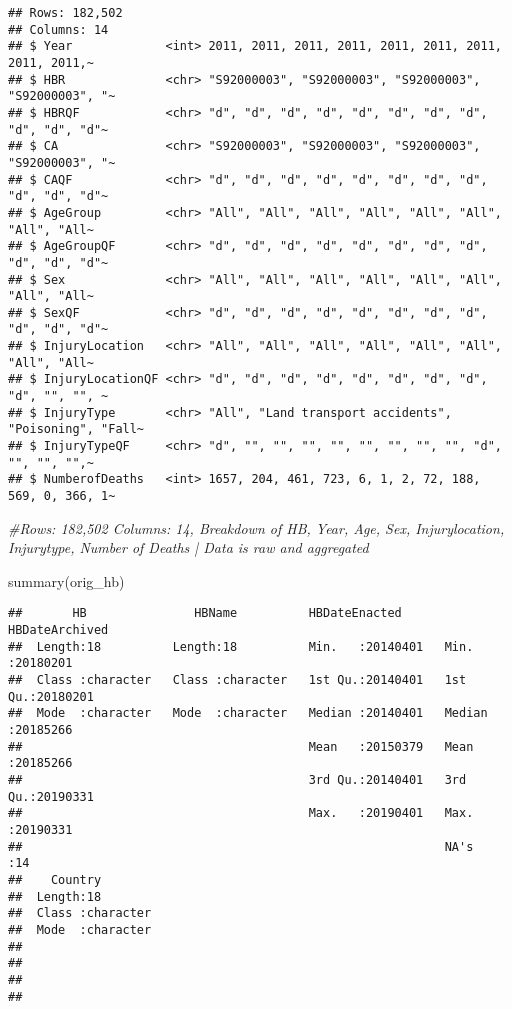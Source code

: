\documentclass[
]{article}
\newenvironment{Shaded}{\begin{snugshade}}{\end{snugshade}}
\newcommand{\CommentTok}[1]{\textcolor[rgb]{0.56,0.35,0.01}{\textit{#1}}}
\newcommand{\FunctionTok}[1]{\textcolor[rgb]{0.00,0.00,0.00}{#1}}
\newcommand{\NormalTok}[1]{#1}
\begin{document}
\begin{verbatim}
## Rows: 182,502
## Columns: 14
## $ Year             <int> 2011, 2011, 2011, 2011, 2011, 2011, 2011, 2011, 2011,~
## $ HBR              <chr> "S92000003", "S92000003", "S92000003", "S92000003", "~
## $ HBRQF            <chr> "d", "d", "d", "d", "d", "d", "d", "d", "d", "d", "d"~
## $ CA               <chr> "S92000003", "S92000003", "S92000003", "S92000003", "~
## $ CAQF             <chr> "d", "d", "d", "d", "d", "d", "d", "d", "d", "d", "d"~
## $ AgeGroup         <chr> "All", "All", "All", "All", "All", "All", "All", "All~
## $ AgeGroupQF       <chr> "d", "d", "d", "d", "d", "d", "d", "d", "d", "d", "d"~
## $ Sex              <chr> "All", "All", "All", "All", "All", "All", "All", "All~
## $ SexQF            <chr> "d", "d", "d", "d", "d", "d", "d", "d", "d", "d", "d"~
## $ InjuryLocation   <chr> "All", "All", "All", "All", "All", "All", "All", "All~
## $ InjuryLocationQF <chr> "d", "d", "d", "d", "d", "d", "d", "d", "d", "", "", ~
## $ InjuryType       <chr> "All", "Land transport accidents", "Poisoning", "Fall~
## $ InjuryTypeQF     <chr> "d", "", "", "", "", "", "", "", "", "d", "", "", "",~
## $ NumberofDeaths   <int> 1657, 204, 461, 723, 6, 1, 2, 72, 188, 569, 0, 366, 1~
\end{verbatim}

\begin{Shaded}
\begin{Highlighting}[]
\CommentTok{\#Rows: 182,502 Columns: 14, Breakdown of HB, Year, Age, Sex, Injurylocation, Injurytype, Number of Deaths | Data is raw and aggregated}

\FunctionTok{summary}\NormalTok{(orig\_hb)}
\end{Highlighting}
\end{Shaded}

\begin{verbatim}
##       HB               HBName          HBDateEnacted      HBDateArchived    
##  Length:18          Length:18          Min.   :20140401   Min.   :20180201  
##  Class :character   Class :character   1st Qu.:20140401   1st Qu.:20180201  
##  Mode  :character   Mode  :character   Median :20140401   Median :20185266  
##                                        Mean   :20150379   Mean   :20185266  
##                                        3rd Qu.:20140401   3rd Qu.:20190331  
##                                        Max.   :20190401   Max.   :20190331  
##                                                           NA's   :14        
##    Country         
##  Length:18         
##  Class :character  
##  Mode  :character  
##                    
##                    
##                    
## 
\end{verbatim}
\end{document}
